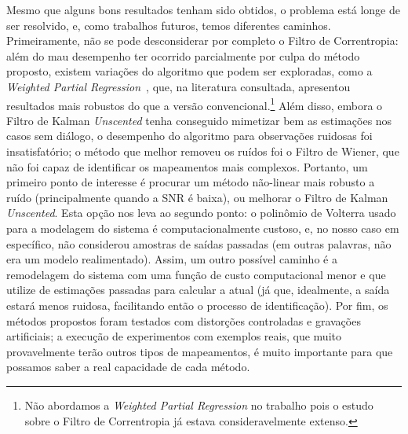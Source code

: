 Mesmo que alguns bons resultados tenham sido obtidos, o problema está longe de ser
resolvido, e, como trabalhos futuros, temos diferentes caminhos. Primeiramente, não se
pode desconsiderar por completo o Filtro de Correntropia: além do mau desempenho ter
ocorrido parcialmente por culpa do método proposto, existem variações do algoritmo que
podem ser exploradas, como a \textit{Weighted Partial Regression}~\cite{pokharel-2007},
que, na literatura consultada, apresentou resultados mais robustos do que a versão
convencional.\footnote{Não abordamos a \textit{Weighted Partial Regression} no trabalho
	pois o estudo sobre o Filtro de Correntropia já estava consideravelmente extenso.} Além
disso, embora o Filtro de Kalman \textit{Unscented} tenha conseguido mimetizar bem as
estimações nos casos sem diálogo, o desempenho do algoritmo para observações ruidosas
foi insatisfatório; o método que melhor removeu os ruídos foi o Filtro de Wiener, que
não foi capaz de identificar os mapeamentos mais complexos. Portanto, um primeiro ponto
de interesse é procurar um método não-linear mais robusto a ruído (principalmente
quando a SNR é baixa), ou melhorar o Filtro de Kalman \textit{Unscented}. Esta opção
nos leva ao segundo ponto: o polinômio de Volterra usado para a modelagem do sistema é
computacionalmente custoso, e, no nosso caso em específico, não considerou amostras de
saídas passadas (em outras palavras, não era um modelo realimentado). Assim, um outro
possível caminho é a remodelagem do sistema com uma função de custo computacional menor
e que utilize de estimações passadas para calcular a atual (já que, idealmente, a saída
estará menos ruidosa, facilitando então o processo de identificação). Por fim, os
métodos propostos foram testados com distorções controladas e gravações artificiais; a
execução de experimentos com exemplos reais, que muito provavelmente terão outros tipos
de mapeamentos, é muito importante para que possamos saber a real capacidade de cada
método.
